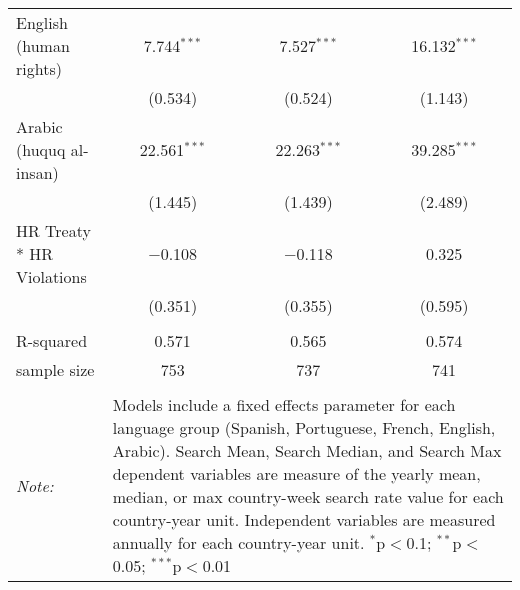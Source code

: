 \begin{table}[!htbp]
\begin{tabular}{@{\extracolsep{5pt}}lccc}
  English (human rights) & 7.744$^{***}$ & 7.527$^{***}$ & 16.132$^{***}$ \\ 
  & (0.534) & (0.524) & (1.143) \\ 
  Arabic (huquq al-insan) & 22.561$^{***}$ & 22.263$^{***}$ & 39.285$^{***}$ \\ 
  & (1.445) & (1.439) & (2.489) \\ 
  HR Treaty * HR Violations & $-$0.108 & $-$0.118 & 0.325 \\ 
  & (0.351) & (0.355) & (0.595) \\ 
 \hline \\[-1.8ex] 
R-squared  & 0.571 & 0.565 & 0.574 \\ 
sample size  & 753 & 737 & 741 \\ 
\hline 
\hline \\[-1.8ex] 
\textit{Note:}  & \multicolumn{3}{l}{\parbox[t]{8cm}{Models include a fixed effects parameter for each language group (Spanish, Portuguese, French, English, Arabic). Search Mean, Search Median, and Search Max dependent variables are measure of the yearly mean, median, or max country-week search rate value for each country-year unit. Independent variables are measured annually for each country-year unit. $^{*}$p$<$0.1; $^{**}$p$<$0.05; $^{***}$p$<$0.01}} \\ 
\end{tabular} 
\end{table} 
